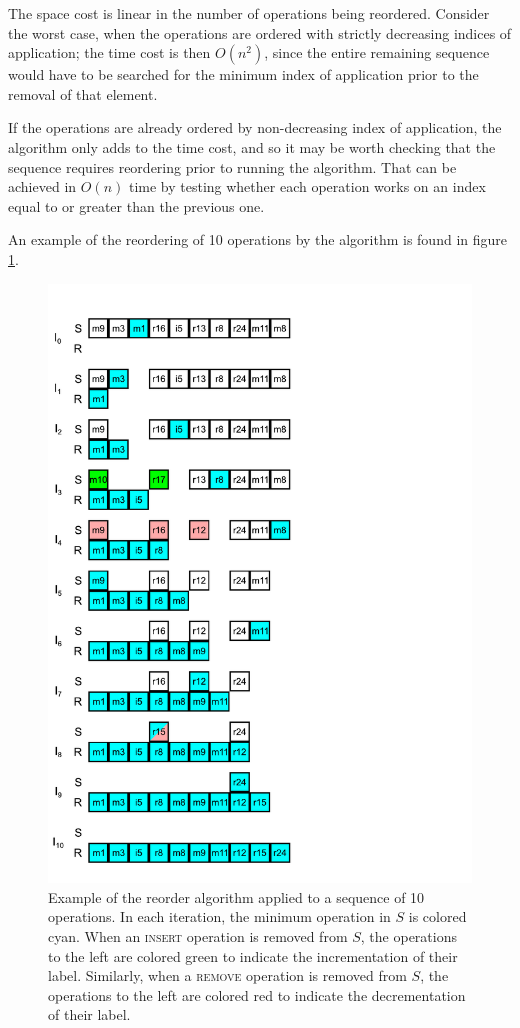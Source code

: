 The space cost is linear in the number of operations being reordered. Consider
the worst case, when the operations are ordered with strictly decreasing indices
of application; the time cost is then $O\left(n^2\right)$, since the entire
remaining sequence would have to be searched for the minimum index of
application prior to the removal of that element.

If the operations are already ordered by non-decreasing index of application,
the algorithm only adds to the time cost, and so it may be worth checking that
the sequence requires reordering prior to running the algorithm. That can be
achieved in $O(n)$ time by testing whether each operation works on an index
equal to or greater than the previous one.

An example of the reordering of 10 operations by the algorithm is found in
figure \ref{fig:reorder-example}.

\begin{figure}[p]
  \includegraphics[width=.9\textwidth]{figures/reorder_example.pdf}

  \caption{\small Example of the reorder algorithm applied to a sequence of 10
  operations. In each iteration, the minimum operation in $S$ is colored cyan.
  When an \textsc{insert} operation is removed from $S$, the operations to the
  left are colored green to indicate the incrementation of their label.
  Similarly, when a \textsc{remove} operation is removed from $S$, the
  operations to the left are colored red to indicate the decrementation of their
  label.}

  \label{fig:reorder-example}
\end{figure}

